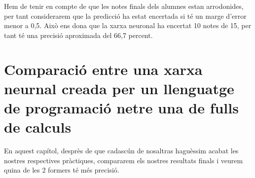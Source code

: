Hem de tenir en compte de que les notes finals dels alumnes estan arrodonides, per tant considerarem que la predicció ha estat encertada si té un marge d'error menor a 0,5. Això ens dona que la xarxa neuronal ha encertat 10 notes de 15, per tant té una precisió aproximada del 66,7 percent.

\section{Comparació entre una xarxa neurnal creada per un llenguatge de programació netre una de fulls de calculs}
En aquest capítol, desprès de que cadascún de nosaltras haguèssim acabat les nostres respectives pràctiques, compararem els nostres resultats finals i veurem quina de les 2 formers té més precisió.
